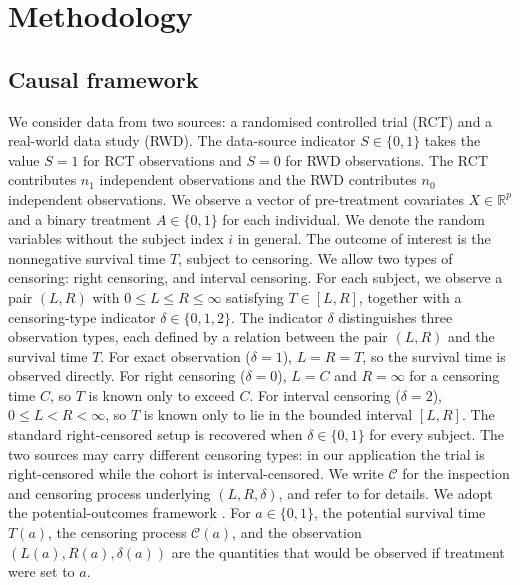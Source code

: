 \section{Methodology}

\subsection{Causal framework}

We consider data from two sources: a randomised controlled trial (RCT) and a real-world data study (RWD).
The data-source indicator $S \in \{0, 1\}$ takes the value $S = 1$ for RCT observations and $S = 0$ for RWD observations.
The RCT contributes $n_1$ independent observations and the RWD contributes $n_0$ independent observations.
We observe a vector of pre-treatment covariates $X \in \mathbb{R}^p$ and a binary treatment $A \in \{0, 1\}$ for each individual.
We denote the random variables without the subject index $i$ in general.
The outcome of interest is the nonnegative survival time $T$, subject to censoring.
We allow two types of censoring: right censoring, and interval censoring.
For each subject, we observe a pair $(L, R)$ with $0 \leq L \leq R \leq \infty$ satisfying $T \in [L, R]$, together with a censoring-type indicator $\delta \in \{0, 1, 2\}$.
The indicator $\delta$ distinguishes three observation types, each defined by a relation between the pair $(L, R)$ and the survival time $T$.
For exact observation ($\delta = 1$), $L = R = T$, so the survival time is observed directly.
For right censoring ($\delta = 0$), $L = C$ and $R = \infty$ for a censoring time $C$, so $T$ is known only to exceed $C$.
For interval censoring ($\delta = 2$), $0 \leq L < R < \infty$, so $T$ is known only to lie in the bounded interval $[L, R]$.
The standard right-censored setup is recovered when $\delta \in \{0, 1\}$ for every subject.
The two sources may carry different censoring types: in our application the trial is right-censored while the cohort is interval-censored.
We write $\mathcal{C}$ for the inspection and censoring process underlying $(L, R, \delta)$, and refer to \citet{sun2006statistical} for details.
We adopt the potential-outcomes framework \citep{rubin1974}.
For $a \in \{0, 1\}$, the potential survival time $T(a)$, the censoring process $\mathcal{C}(a)$, and the observation $(L(a), R(a), \delta(a))$ are the quantities that would be observed if treatment were set to $a$.



